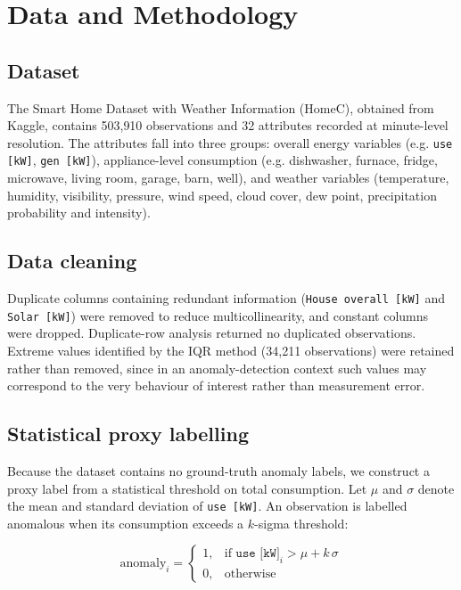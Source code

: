 \documentclass[pdflatex,sn-mathphys-num]{sn-jnl}%
\theoremstyle{thmstyleone}%
\theoremstyle{thmstyletwo}%
\theoremstyle{thmstylethree}%
\begin{document}
\section{Data and Methodology}\label{sec4}

\subsection{Dataset}\label{subsec:data}

The Smart Home Dataset with Weather Information (HomeC), obtained from Kaggle, contains 503{,}910 observations and 32 attributes recorded at minute-level resolution. The attributes fall into three groups: overall energy variables (e.g. \texttt{use [kW]}, \texttt{gen [kW]}), appliance-level consumption (e.g. dishwasher, furnace, fridge, microwave, living room, garage, barn, well), and weather variables (temperature, humidity, visibility, pressure, wind speed, cloud cover, dew point, precipitation probability and intensity).

\subsection{Data cleaning}\label{subsec:clean}

Duplicate columns containing redundant information (\texttt{House overall [kW]} and \texttt{Solar [kW]}) were removed to reduce multicollinearity, and constant columns were dropped. Duplicate-row analysis returned no duplicated observations. Extreme values identified by the IQR method (34{,}211 observations) were retained rather than removed, since in an anomaly-detection context such values may correspond to the very behaviour of interest rather than measurement error.

\subsection{Statistical proxy labelling}\label{subsec:label}

Because the dataset contains no ground-truth anomaly labels, we construct a proxy label from a statistical threshold on total consumption. Let $\mu$ and $\sigma$ denote the mean and standard deviation of \texttt{use [kW]}. An observation is labelled anomalous when its consumption exceeds a $k$-sigma threshold:

\begin{equation}
\text{anomaly}_i =
\begin{cases}
1, & \text{if } \texttt{use [kW]}_i > \mu + k\,\sigma \\
0, & \text{otherwise}
\end{cases}
\label{eq:label}
\end{equation}
\end{document}
